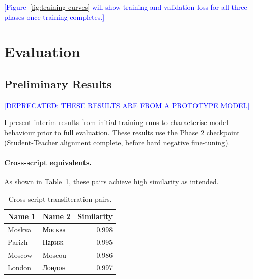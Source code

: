 \documentclass[11pt,a4paper]{article}
\newcommand{\placeholder}[1]{\textcolor{blue}{[#1]}}
\begin{document}
\placeholder{Figure~\ref{fig:training-curves} will show training and validation loss for all three phases once training completes.}



\section{Evaluation}
\label{sec:evaluation}

\subsection{Preliminary Results}

\placeholder{DEPRECATED: THESE RESULTS ARE FROM A PROTOTYPE MODEL}

I present interim results from initial training runs to characterise model behaviour prior to full evaluation. These results use the Phase 2 checkpoint (Student-Teacher alignment complete, before hard negative fine-tuning).

\paragraph{Cross-script equivalents.} As shown in Table~\ref{tab:cross-script}, these pairs achieve high similarity as intended.

\begin{table}[ht]
\centering
\begin{tabular}{ll r}
\toprule
\textbf{Name 1} & \textbf{Name 2} & \textbf{Similarity} \\
\midrule
Moskva & Москва & 0.998 \\
Parizh & Париж & 0.995 \\
Moscow & Moscou & 0.986 \\
London & Лондон & 0.997 \\
\bottomrule
\end{tabular}
\caption{Cross-script transliteration pairs.}
\label{tab:cross-script}
\end{table}
\end{document}
